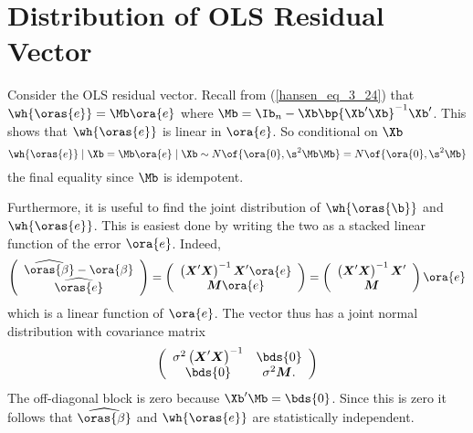 \section{Distribution of OLS Residual Vector}

Consider the OLS residual vector. Recall from (\ref{hansen_eq_3_24}) that $\wh{\oras{e}} = \Mb \ora{e}$ where $\Mb = \Ib_n - \Xb  \bp{\Xb^\prime \Xb}^{-1} \Xb^\prime$. This shows that $\wh{\oras{e}}$ is linear in $\ora{e}$. So conditional on $\Xb$ 
\begin{equation}
    \notag
    \wh{\oras{e}} \mid \Xb  = \Mb \ora{e} \mid \Xb \sim N\of{\ora{0}, \s^2 \Mb \Mb} = N\of{\ora{0}, \s^2 \Mb}
\end{equation}
the final equality since $\Mb$ is idempotent.

Furthermore, it is useful to find the joint distribution of $\wh{\oras{\b}}$ and $\wh{\oras{e}}$. This is easiest done by writing the two as a stacked linear function of the error $\ora{e}$. Indeed, 
\begin{equation}
    \notag
    \left(\begin{array}{c}
        \widehat{\oras{\beta}}-\ora{\beta} \\
        \widehat{\oras{e}}
        \end{array}\right)=\left(\begin{array}{c}
        \left(\boldsymbol{X}^{\prime} \boldsymbol{X}\right)^{-1} \boldsymbol{X}^{\prime} \ora{e} \\
        \boldsymbol{M} \ora{e}
        \end{array}\right)=\left(\begin{array}{c}
        \left(\boldsymbol{X}^{\prime} \boldsymbol{X}\right)^{-1} \boldsymbol{X}^{\prime} \\
        \boldsymbol{M}
    \end{array}\right) \ora{e}
\end{equation}
which is a linear function of $\ora{e}$. The vector thus has a joint normal distribution with covariance matrix 
\begin{equation}
    \notag
    \left(\begin{array}{cc}
        \sigma^2\left(\boldsymbol{X}^{\prime} \boldsymbol{X}\right)^{-1} & \bds{0} \\
        \bds{0} & \sigma^2 \boldsymbol{M} .
    \end{array}\right)
\end{equation}
The off-diagonal block is zero because $\Xb^\prime \Mb = \bds{0}$. Since this is zero it follows that $\widehat{\oras{\beta}}$ and $\wh{\oras{e}}$ are statistically independent.

